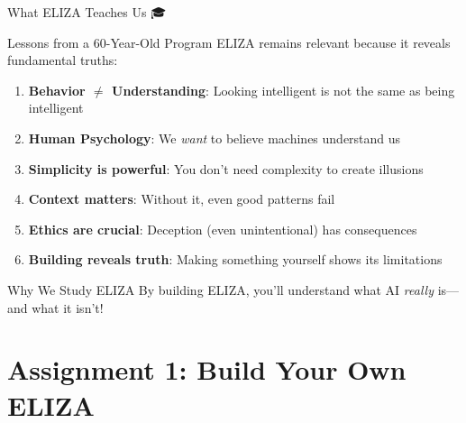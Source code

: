 \documentclass[aspectratio=169]{beamer}
\begin{document}
\begin{frame}[shrink=10]{What ELIZA Teaches Us 🎓}
\small
\begin{block}{Lessons from a 60-Year-Old Program}
ELIZA remains relevant because it reveals fundamental truths:
\end{block}

\vspace{0.3cm}

\begin{enumerate}\setlength{\itemsep}{0pt}
    \item \textbf{Behavior $\neq$ Understanding}: Looking intelligent is not the same as being intelligent
    \item \textbf{Human Psychology}: We \textit{want} to believe machines understand us
    \item \textbf{Simplicity is powerful}: You don't need complexity to create illusions
    \item \textbf{Context matters}: Without it, even good patterns fail
    \item \textbf{Ethics are crucial}: Deception (even unintentional) has consequences
    \item \textbf{Building reveals truth}: Making something yourself shows its limitations
\end{enumerate}

\vspace{0.3cm}

\begin{alertblock}{Why We Study ELIZA}
By building ELIZA, you'll understand what AI \textit{really} is—and what it isn't!
\end{alertblock}
\end{frame}

\section{Assignment 1: Build Your Own ELIZA}
\end{document}
